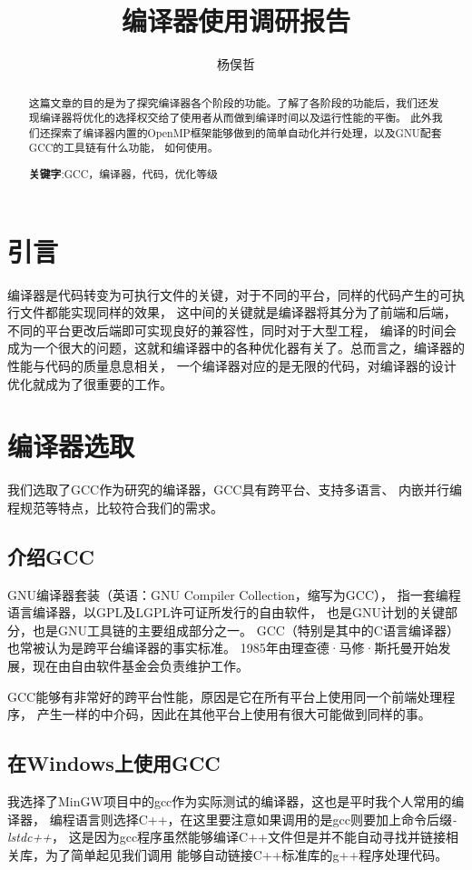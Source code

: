 \documentclass[UTF8]{ctexart}
\begin{document}
    \title{编译器使用调研报告}
    \author{杨俣哲}
    \maketitle
    \begin{abstract}
    这篇文章的目的是为了探究编译器各个阶段的功能。了解了各阶段的功能后，我们还发现编译器将优化的选择权交给了使用者从而做到编译时间以及运行性能的平衡。
    此外我们还探索了编译器内置的OpenMP框架能够做到的简单自动化并行处理，以及GNU配套GCC的工具链有什么功能，
    如何使用。
    
    \centering
    \textbf{关键字}:GCC，编译器，代码，优化等级
    \end{abstract}
    \newpage
    \tableofcontents
    \newpage
    \section{引言}
    编译器是代码转变为可执行文件的关键，对于不同的平台，同样的代码产生的可执行文件都能实现同样的效果，
    这中间的关键就是编译器将其分为了前端和后端，不同的平台更改后端即可实现良好的兼容性，同时对于大型工程，
    编译的时间会成为一个很大的问题，这就和编译器中的各种优化器有关了。总而言之，编译器的性能与代码的质量息息相关，
    一个编译器对应的是无限的代码，对编译器的设计优化就成为了很重要的工作。
    \section{编译器选取}
    我们选取了GCC作为研究的编译器，GCC具有跨平台、支持多语言、
    内嵌并行编程规范等特点，比较符合我们的需求。
    \subsection{介绍GCC}
    GNU编译器套装（英语：GNU Compiler Collection，缩写为GCC），
    指一套编程语言编译器，以GPL及LGPL许可证所发行的自由软件，
    也是GNU计划的关键部分，也是GNU工具链的主要组成部分之一。
    GCC（特别是其中的C语言编译器）也常被认为是跨平台编译器的事实标准。
    1985年由理查德·马修·斯托曼开始发展，现在由自由软件基金会负责维护工作。\cite{GCCWiki}

    GCC能够有非常好的跨平台性能，原因是它在所有平台上使用同一个前端处理程序，
    产生一样的中介码，因此在其他平台上使用有很大可能做到同样的事。
    \subsection{在Windows上使用GCC}
    我选择了MinGW项目中的gcc作为实际测试的编译器，这也是平时我个人常用的编译器，
    编程语言则选择C++，在这里要注意如果调用的是gcc则要加上命令后缀\emph{-lstdc++}，
    这是因为gcc程序虽然能够编译C++文件但是并不能自动寻找并链接相关库，为了简单起见我们调用
    能够自动链接C++标准库的g++程序处理代码。
\end{document}
